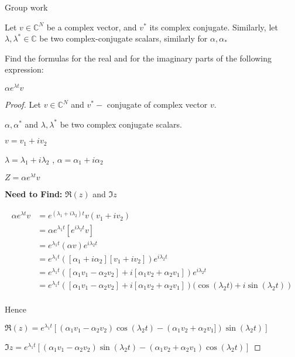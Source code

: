Group work
\begin{example}

    Let $v \in \mathbb{C} ^N $ be a complex vector, and $v^*$ its complex conjugate. Similarly, let $\lambda,\lambda^* \in \mathbb{C}$ be two complex-conjugate scalars, similarly for $\alpha, \alpha_*$ 
    
    
    Find the formulas for the real and for the imaginary parts of the following expression:
    
    
    
\begin{center}
    $\alpha e^{\lambda t}v$
\end{center}

\begin{proof}

    Let $v \in \mathbb{C}^N$ and $v^* -$ conjugate of complex vector $v$.
    
    
    $\alpha , \alpha^*$ and $\lambda , \lambda^*$ be two complex conjugate scalars.
  
  
    $v=v_1 + i v_2$
    
    
    $\lambda = \lambda_1 + i \lambda_2$ , $\alpha = \alpha_1 + i \alpha_2$
    
    
    $Z=\alpha e^{\lambda t}v$
    
    \textbf{Need to Find:} $\Re(z)$ and $\Im{z}$
    
   
\begin{align*}
 \alpha e^{\lambda t}v &= e^{(\lambda_1 + i \lambda_2) t}v(v_1 + i v_2) \\
                       &= \alpha  e^{\lambda_1 t}[e^{i \lambda_2 t}v] \\
                       &= e^{\lambda_1 t}(\alpha v)e^{i \lambda_2 t} \\
                       &= e^{\lambda_1 t}([\alpha_1 + i \alpha_2][v_1 + i v_2])e^{i \lambda_2 t} \\
                       &= e^{\lambda_1 t}([\alpha_1v_1 - \alpha_2v_2]+i[\alpha_1v_2 + \alpha_2v_1])e^{i \lambda_2 t} \\
                       &= e^{\lambda_1 t}([\alpha_1v_1 - \alpha_2v_2]+i[\alpha_1v_2 + \alpha_2v_1])(\cos({\lambda_2 t)}+ i \sin{(\lambda_2 t)}) \\
\end{align*} 
    
   Hence
   
   
   $\Re(z)= e^{\lambda_1 t}[(\alpha_1v_1 - \alpha_2v_2)\cos({\lambda_2 t}) - (\alpha_1v_2 + \alpha_2v_1])\sin{(\lambda_2 t)}]$
   
   
   $\Im{z}= e^{\lambda_1 t}[(\alpha_1v_1 - \alpha_2v_2) \sin{(\lambda_2 t)} - (\alpha_1v_2 + \alpha_2v_1) \cos({\lambda_2 t})] $
   
   
    
\end{proof}

\end{example}

